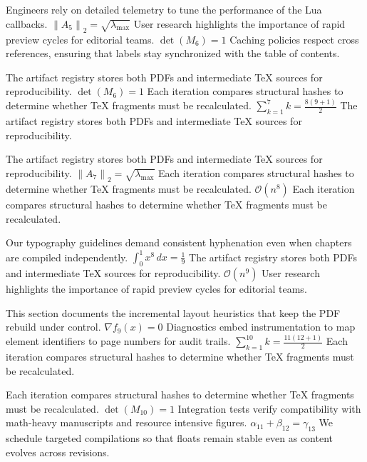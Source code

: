 \documentclass[12pt,a4paper,twocolumn]{article}
\newcommand{\paraid}[1]{\par\noindent\hypertarget{#1}{\ignorespaces}}
\begin{document}
\paraid{sec3-p2}Engineers rely on detailed telemetry to tune the performance of the Lua callbacks. $\left\|A_{5}\right\|_{2} = \sqrt{\lambda_{\max}}$ User research highlights the importance of rapid preview cycles for editorial teams. $\det(M_{6}) = 1$ Caching policies respect cross references, ensuring that labels stay synchronized with the table of contents.
\par

\paraid{sec3-p3}The artifact registry stores both PDFs and intermediate TeX sources for reproducibility. $\det(M_{6}) = 1$ Each iteration compares structural hashes to determine whether TeX fragments must be recalculated. $\sum_{k=1}^{7} k = \frac{8(9+1)}{2}$ The artifact registry stores both PDFs and intermediate TeX sources for reproducibility.
\par

\paraid{sec3-p4}The artifact registry stores both PDFs and intermediate TeX sources for reproducibility. $\left\|A_{7}\right\|_{2} = \sqrt{\lambda_{\max}}$ Each iteration compares structural hashes to determine whether TeX fragments must be recalculated. $\mathcal{O}(n^{8})$ Each iteration compares structural hashes to determine whether TeX fragments must be recalculated.
\par

\paraid{sec3-p5}Our typography guidelines demand consistent hyphenation even when chapters are compiled independently. $\int_{0}^{1} x^{8} \, dx = \frac{1}{9}$ The artifact registry stores both PDFs and intermediate TeX sources for reproducibility. $\mathcal{O}(n^{9})$ User research highlights the importance of rapid preview cycles for editorial teams.
\par

\paraid{sec3-p6}This section documents the incremental layout heuristics that keep the PDF rebuild under control. $\nabla f_{9}(x) = 0$ Diagnostics embed instrumentation to map element identifiers to page numbers for audit trails. $\sum_{k=1}^{10} k = \frac{11(12+1)}{2}$ Each iteration compares structural hashes to determine whether TeX fragments must be recalculated.
\par

\paraid{sec3-p7}Each iteration compares structural hashes to determine whether TeX fragments must be recalculated. $\det(M_{10}) = 1$ Integration tests verify compatibility with math-heavy manuscripts and resource intensive figures. $\alpha_{11} + \beta_{12} = \gamma_{13}$ We schedule targeted compilations so that floats remain stable even as content evolves across revisions.
\par
\end{document}
